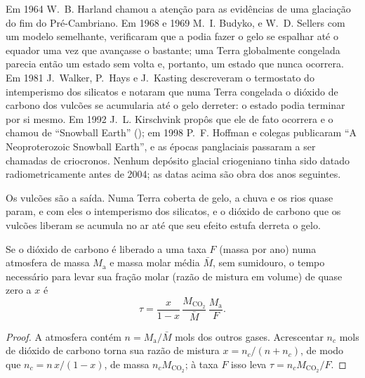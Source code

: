\begin{history}
Em 1964 W.~B. Harland chamou a atenção para as evidências de uma glaciação do fim do Pré-Cambriano. Em
1968 e 1969 M.~I. Budyko, e W.~D. Sellers com um modelo semelhante, verificaram que a
 podia fazer o gelo se espalhar até o equador uma vez que avançasse o bastante; uma
Terra globalmente congelada parecia então um estado sem volta e, portanto, um estado que nunca ocorrera.
Em 1981 J.~Walker, P.~Hays e J.~Kasting descreveram o termostato do intemperismo dos silicatos e
notaram que numa Terra congelada o dióxido de carbono dos vulcões se acumularia até o gelo
derreter: o estado podia terminar por si mesmo. Em 1992 J.~L. Kirschvink propôs que ele de fato
ocorrera e o chamou de ``Snowball Earth'' (); em 1998 P.~F. Hoffman e colegas publicaram
``A Neoproterozoic Snowball Earth'', e as épocas panglaciais passaram a ser chamadas de criocronos. Nenhum
depósito glacial criogeniano tinha sido datado radiometricamente antes de 2004; as datas acima são
obra dos anos seguintes.
\end{history}

Os vulcões são a saída. Numa Terra coberta de gelo, a chuva e os rios quase param, e com eles o
intemperismo dos silicatos, e o dióxido de carbono que os vulcões liberam se acumula no ar
até que seu efeito estufa derreta o gelo.

\begin{proposition}\label{prop:b2:precambrian-earth:co2}
Se o dióxido de carbono é liberado a uma taxa $F$ (massa por ano) numa atmosfera de massa
$M_{\text{a}}$ e massa molar média $\bar M$, sem sumidouro, o tempo necessário para levar sua fração molar
(razão de mistura em volume) de quase zero a $x$ é
\[
  \tau = \frac{x}{1 - x}\,\frac{M_{\mathrm{CO_2}}}{\bar M}\,\frac{M_{\text{a}}}{F} .
\]
\end{proposition}

\begin{proof}
A atmosfera contém $n = M_{\text{a}}/\bar M$ mols dos outros gases. Acrescentar $n_c$ mols de
dióxido de carbono torna sua razão de mistura $x = n_c/(n + n_c)$, de modo que $n_c = n\,x/(1 - x)$, de massa
$n_c M_{\mathrm{CO_2}}$; à taxa $F$ isso leva $\tau = n_c M_{\mathrm{CO_2}}/F$.
\end{proof}

